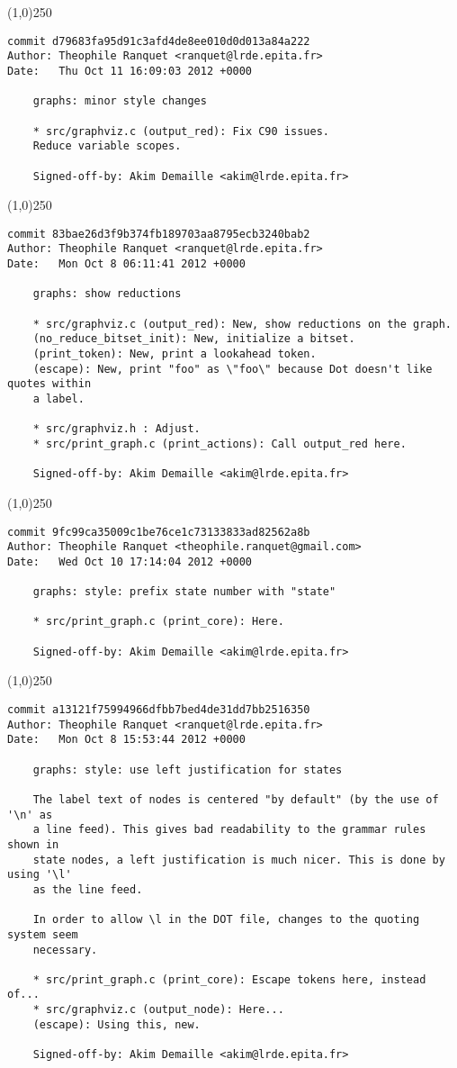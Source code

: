 \line(1,0){250}
\begin{verbatim}
commit d79683fa95d91c3afd4de8ee010d0d013a84a222
Author: Theophile Ranquet <ranquet@lrde.epita.fr>
Date:   Thu Oct 11 16:09:03 2012 +0000

    graphs: minor style changes
    
    * src/graphviz.c (output_red): Fix C90 issues.
    Reduce variable scopes.
    
    Signed-off-by: Akim Demaille <akim@lrde.epita.fr>

\end{verbatim}
\line(1,0){250}
\begin{verbatim}
commit 83bae26d3f9b374fb189703aa8795ecb3240bab2
Author: Theophile Ranquet <ranquet@lrde.epita.fr>
Date:   Mon Oct 8 06:11:41 2012 +0000

    graphs: show reductions
    
    * src/graphviz.c (output_red): New, show reductions on the graph.
    (no_reduce_bitset_init): New, initialize a bitset.
    (print_token): New, print a lookahead token.
    (escape): New, print "foo" as \"foo\" because Dot doesn't like quotes within
    a label.
    
    * src/graphviz.h : Adjust.
    * src/print_graph.c (print_actions): Call output_red here.
    
    Signed-off-by: Akim Demaille <akim@lrde.epita.fr>

\end{verbatim}
\line(1,0){250}
\begin{verbatim}
commit 9fc99ca35009c1be76ce1c73133833ad82562a8b
Author: Theophile Ranquet <theophile.ranquet@gmail.com>
Date:   Wed Oct 10 17:14:04 2012 +0000

    graphs: style: prefix state number with "state"
    
    * src/print_graph.c (print_core): Here.
    
    Signed-off-by: Akim Demaille <akim@lrde.epita.fr>

\end{verbatim}
\line(1,0){250}
\begin{verbatim}
commit a13121f75994966dfbb7bed4de31dd7bb2516350
Author: Theophile Ranquet <ranquet@lrde.epita.fr>
Date:   Mon Oct 8 15:53:44 2012 +0000

    graphs: style: use left justification for states
    
    The label text of nodes is centered "by default" (by the use of '\n' as
    a line feed). This gives bad readability to the grammar rules shown in
    state nodes, a left justification is much nicer. This is done by using '\l'
    as the line feed.
    
    In order to allow \l in the DOT file, changes to the quoting system seem
    necessary.
    
    * src/print_graph.c (print_core): Escape tokens here, instead of...
    * src/graphviz.c (output_node): Here...
    (escape): Using this, new.
    
    Signed-off-by: Akim Demaille <akim@lrde.epita.fr>

\end{verbatim}
